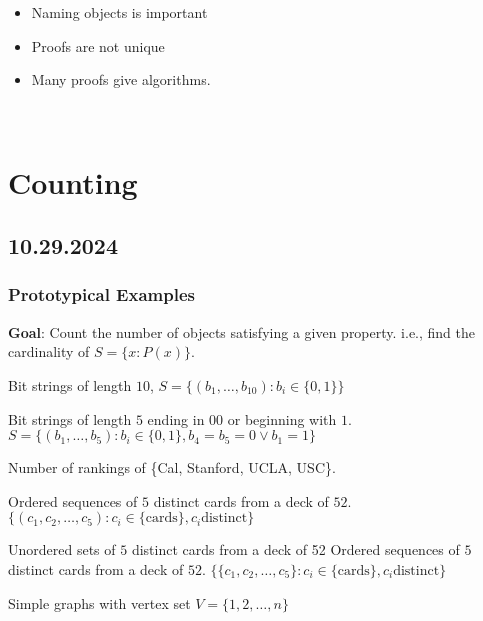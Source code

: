 \documentclass[11pt]{scrartcl}
\begin{document}
\begin{remark}
    \begin{itemize}
        \item Naming objects is important
        \item Proofs are not unique
        \item Many proofs give algorithms.
    \end{itemize}
\end{remark}
\noindent
\Line
\\
\section{Counting}
\subsection{10.29.2024}
\subsubsection{Prototypical Examples}
\textbf{Goal}: Count the number of objects satisfying a given property. i.e., find the cardinality of $S= \{x : P(x)\}$. 
\begin{example}
    Bit strings of length $10$, $S = \{(b_1, \dots, b_{10}) : b_i \in \{0, 1\}\}$
\end{example}
\begin{example}
    Bit strings of length $5$ ending in $00$ or beginning with $1$. $S = \{(b_1, \dots, b_{5}) : b_i \in \{0, 1\}, b_4 = b_5 = 0 \vee b_1 = 1\}$
\end{example}
\begin{example}
    Number of rankings of \{Cal, Stanford, UCLA, USC\}.
\end{example}
\begin{example}
    Ordered sequences of $5$ distinct cards from a deck of $52$. $\{(c_1, c_2, \dots, c_5): c_i \in \{\text{cards}\}, c_i \text{distinct}\}$
\end{example}
\begin{example}
    Unordered sets of $5$ distinct cards from a deck of 52
     Ordered sequences of $5$ distinct cards from a deck of $52$. $\{\{c_1, c_2, \dots, c_5\}: c_i \in \{\text{cards}\}, c_i \text{distinct}\}$
\end{example}
\begin{example}
    Simple graphs with vertex set $V = \{1, 2, \dots, n \}$
\end{example}
\end{document}
